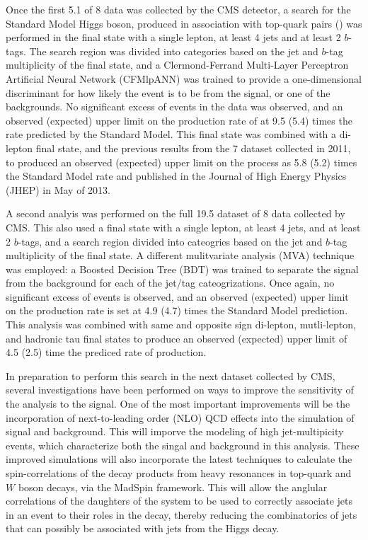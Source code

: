 \par Once the first 5.1 \fbinv of 8 \TeV data was collected by the CMS
detector, a search for the Standard Model Higgs boson, produced in
association with top-quark pairs (\ttH) was performed in the final
state with a single lepton, at least 4 jets and at least 2 $b$-tags.
The search region was divided into categories based on the jet and
$b$-tag multiplicity of the final state, and a Clermond-Ferrand
Multi-Layer Perceptron Artificial Neural Network (CFMlpANN) was
trained to provide a one-dimensional discriminant for how likely the
event is to be from the \ttH signal, or one of the \ttjets
backgrounds.  No significant excess of events in the data was
observed, and an observed (expected) upper limit on the production
rate of \ttH at 9.5 (5.4) times the rate predicted by the Standard
Model.  This final state was combined with a di-lepton final state,
and the previous results from the 7 \TeV dataset collected in 2011, to
produced an observed (expected) upper limit on the \ttH process as 5.8
(5.2) times the Standard Model rate and published in the Journal of
High Energy Physics (JHEP) in May of 2013.  

\par A second analyis was performed on the full 19.5 \fbinv dataset of
8 \TeV data collected by CMS.  This also used a final state with a
single lepton, at least 4 jets, and at least 2 $b$-tags, and a search
region divided into cateogries based on the jet and $b$-tag
multiplicity of the final state.  A different mulitvariate analysis
(MVA) technique was employed: a Boosted Decision Tree (BDT) was
trained to separate the \ttH signal from the \ttjets background for
each of the jet/tag cateogrizations.  Once again, no significant
excess of events is observed, and an observed (expected) upper limit
on the \ttH production rate is set at 4.9 (4.7) times the Standard
Model prediction.  This analysis was combined with same and opposite
sign di-lepton, mutli-lepton, and hadronic tau final states to produce
an observed (expected) upper limit of 4.5 (2.5) time the prediced rate
of \ttH production.  

\par In preparation to perform this search in the next dataset
collected by CMS, several investigations have been performed on ways
to improve the sensitivity of the analysis to the \ttH signal.  One of
the most important improvements will be the incorporation of
next-to-leading order (NLO) QCD effects into the simulation of \ttH
signal and \ttjets background.  This will imporve the modeling of high
jet-multipicity events, which characterize both the singal and
background in this analysis.  These improved simulations will also
incorporate the latest techniques to calculate the spin-correlations
of the decay products from heavy resonances in top-quark and $W$ boson
decays, via the MadSpin framework.  This will allow the anglular
correlations of the daughters of the \ttbar system to be used to
correctly associate jets in an event to their roles in the \ttbar
decay, thereby reducing the combinatorics of jets that can possibly be
associated with jets from the Higgs decay.  


